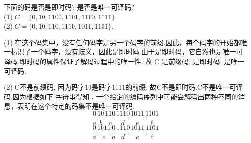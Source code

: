 \begin{tcolorbox}[breakable,colback=blue!5!white,colframe=blue!75!black,
 title= 解答题]
 
下面的码是否是即时码? 是否是唯一可译码?\\
(1) $ C=\{0,10,1100,1101,1110,1111\} $.\\
(2) $ C=\{0,10,110,1110,1011,1101\} $.

\tcblower

(1) 在这个码集中，没有任何码字是另一个码字的前缀.因此，每个码字的开始都唯一标识了一个码字，没有歧义，因此是即时码.由于是即时码，它自然也是唯一可译码.即时码的属性保证了解码过程中的唯一性. 故 C 是前缀码, 是即时码, 是唯一可译码.
 
(2) C不是前缀码, 因为码字10是码字1011的前缀, 故C不是即时码.C不是唯一可译码.因为根据如下
字符串得知：一个给定的编码序列中可能会解码出两种不同的消息，表明在这个特定的码集不是唯一可译码.
$$
\frac{0}{a} \frac{10}{b} \frac{110}{c} \frac{1110}{d} \frac{1011}{e} \frac{1101}{\mathrm{f}} $$
$$
\frac{0}{a} \frac{1011}{e} \frac{0}{a} \frac{1110}{d} \frac{1011}{e} \frac{1101}{\mathrm{f}}
$$

\end{tcolorbox}


